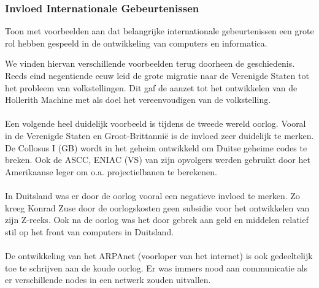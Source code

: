 \documentclass[../main.tex]{subfiles}
\begin{document}
\subsubsection{Invloed Internationale Gebeurtenissen}
\begin{question}
Toon met voorbeelden aan dat belangrijke internationale gebeurtenissen een grote rol hebben gespeeld in de ontwikkeling van computers en informatica.
\end{question}
\begin{solution}
We vinden hiervan verschillende voorbeelden terug doorheen de geschiedenis.
Reeds eind negentiende eeuw leid de grote migratie naar de Verenigde Staten tot het probleem van volkstellingen.
Dit gaf de aanzet tot het ontwikkelen van de Hollerith Machine met als doel het vereenvoudigen van de volkstelling.
\\\\
Een volgende heel duidelijk voorbeeld is tijdens de tweede wereld oorlog.
Vooral in de Verenigde Staten en Groot-Brittanni\"e is de invloed zeer duidelijk te merken.
De Collosus I (GB) wordt in het geheim ontwikkeld om Duitse geheime codes te breken.
Ook de ASCC, ENIAC (VS) van zijn opvolgers werden gebruikt door het Amerikaanse leger om o.a. projectielbanen te berekenen.
\\\\
In Duitsland was er door de oorlog vooral een negatieve invloed te merken.
Zo kreeg Konrad Zuse door de oorlogskosten geen subsidie voor het ontwikkelen van zijn Z-reeks.
Ook na de oorlog was het door gebrek aan geld en middelen relatief stil op het front van computers in Duitsland.
\\\\
De ontwikkeling van het ARPAnet (voorloper van het internet) is ook gedeeltelijk toe te schrijven aan de koude oorlog.
Er was immers nood aan communicatie als er verschillende nodes in een netwerk zouden uitvallen.
\end{solution}
\end{document}
